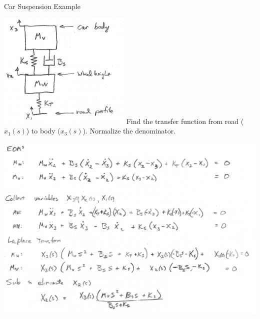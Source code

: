 \begin{Example}\label{ExampleCarSuspensionTF}   %
Car Suspension Example

\includegraphics[width=2.5in]{figs02/00730a.png}    Find the transfer function from road ($x_1(s)$) to body ($x_3(s)$).
Normalize the denominator.


\includegraphics[width=6.25in]{figs02/00731a.png}

\end{Example}

